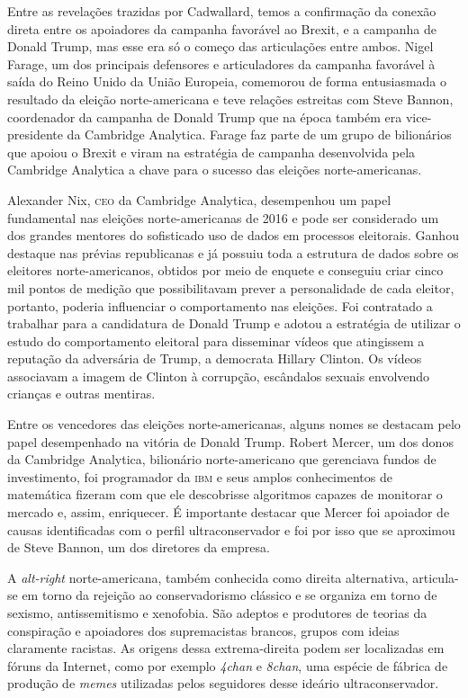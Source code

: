 Entre as revelações trazidas por Cadwallard, temos a confirmação da
conexão direta entre os apoiadores da campanha favorável ao Brexit, e a
campanha de Donald Trump, mas esse era só o começo das articulações
entre ambos. Nigel Farage, um dos principais defensores e articuladores
da campanha favorável à saída do Reino Unido da União Europeia,
comemorou de forma entusiasmada o resultado da eleição norte-americana e teve
relações estreitas com Steve Bannon, coordenador da campanha de Donald
Trump que na época também era vice-presidente da Cambridge Analytica.
Farage faz parte de um grupo de bilionários que apoiou o Brexit e viram
na estratégia de campanha desenvolvida pela Cambridge Analytica a chave
para o sucesso das eleições norte-americanas.

Alexander Nix, \textsc{ceo} da Cambridge Analytica, desempenhou um papel
fundamental nas eleições norte-americanas de 2016 e pode ser considerado um
dos grandes mentores do sofisticado uso de dados em processos eleitorais.
Ganhou destaque nas prévias republicanas e já possuiu toda a estrutura
de dados sobre os eleitores norte-americanos, obtidos por meio de enquete e
conseguiu criar cinco mil pontos de medição que possibilitavam prever a
personalidade de cada eleitor, portanto, poderia influenciar o
comportamento nas eleições. Foi contratado a trabalhar para a
candidatura de Donald Trump e adotou a estratégia de utilizar o estudo
do comportamento eleitoral para disseminar vídeos que atingissem a
reputação da adversária de Trump, a democrata Hillary Clinton. Os vídeos
associavam a imagem de Clinton à corrupção, escândalos sexuais
envolvendo crianças e outras mentiras.

Entre os vencedores das eleições norte-americanas, alguns nomes se destacam
pelo papel desempenhado na vitória de Donald Trump. Robert Mercer, um
dos donos da Cambridge Analytica, bilionário norte-americano que gerenciava
fundos de investimento, foi programador da \textsc{ibm} e seus amplos
conhecimentos de matemática fizeram com que ele descobrisse algoritmos
capazes de monitorar o mercado e, assim, enriquecer. É importante
destacar que Mercer foi apoiador de causas identificadas com o perfil
ultraconservador e foi por isso que se aproximou de Steve Bannon, um dos
diretores da empresa.

A \textit{alt-right} norte-americana, também conhecida como direita alternativa,
articula-se em torno da rejeição ao conservadorismo clássico e se
organiza em torno de sexismo, antissemitismo e xenofobia. São adeptos e
produtores de teorias da conspiração e apoiadores dos supremacistas
brancos, grupos com ideias claramente racistas. As origens dessa extrema-direita podem ser localizadas em fóruns da Internet, como por exemplo
\textit{4chan} e \textit{8chan}, uma espécie de fábrica de produção de \textit{memes} utilizadas
pelos seguidores desse ideário ultraconservador.


